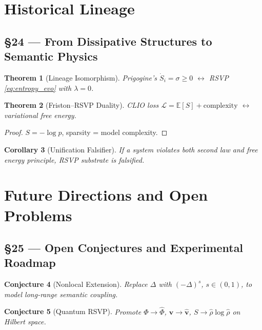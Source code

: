 \documentclass[11pt]{article}
\newtheorem{theorem}{Theorem}[section]
\newtheorem{corollary}[theorem]{Corollary}
\newtheorem{conjecture}[theorem]{Conjecture}
\theoremstyle{definition}
\theoremstyle{remark}
\newcommand{\vect}[1]{\bm{#1}}
\begin{document}
\section{Historical Lineage}

\subsection*{§24 — From Dissipative Structures to Semantic Physics}

\begin{theorem}[Lineage Isomorphism]
Prigogine’s $\dot{S}_i = \sigma \ge 0$ $\leftrightarrow$ RSVP \eqref{eq:entropy_evo} with $\lambda = 0$.
\end{theorem}

\begin{theorem}[Friston–RSVP Duality]
CLIO loss $\mathcal{L} = \mathbb{E}[S] + \text{complexity}$ $\leftrightarrow$ variational free energy.
\end{theorem}

\begin{proof}
$S = -\log p$, sparsity = model complexity.
\end{proof}

\begin{corollary}[Unification Falsifier]
If a system violates both second law and free energy principle, RSVP substrate is falsified.
\end{corollary}

\section{Future Directions and Open Problems}

\subsection*{§25 — Open Conjectures and Experimental Roadmap}

\begin{conjecture}[Nonlocal Extension]
Replace $\Delta$ with $(-\Delta)^s$, $s \in (0,1)$, to model long-range semantic coupling.
\end{conjecture}

\begin{conjecture}[Quantum RSVP]
Promote $\Phi \to \hat{\Phi}$, $\vect{v} \to \hat{\mathbf{v}}$, $S \to \hat{\rho} \log \hat{\rho}$ on Hilbert space.
\end{conjecture}
\end{document}
